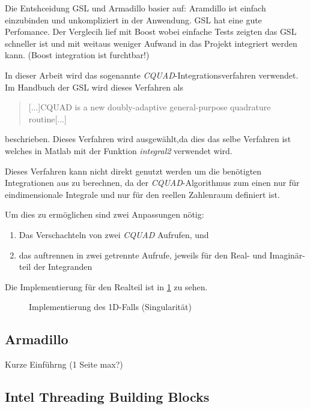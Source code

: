 Die Entshceidung GSL und Armadillo basier auf: Aramdillo ist einfach einzubinden und unkompliziert in der Anwendung.
GSL hat eine gute Perfomance. Der Verglecih lief mit Boost wobei einfache Tests zeigten das GSL schneller ist und mit weitaus weniger Aufwand in das Projekt integriert werden kann.
(Boost integration ist furchtbar!)

In dieser Arbeit wird das sogenannte \textit{CQUAD}-Integrationsverfahren verwendet.
Im Handbuch der GSL wird dieses Verfahren als
\begin{quotation}
    [...]CQUAD is a new doubly-adaptive general-purpose quadrature routine[...]
\end{quotation} \cite*[Kapitel 17.11]{book} beschrieben. Dieses Verfahren wird ausgewählt,da 
dies das selbe Verfahren ist welches in Matlab mit der Funktion \textit{integral2} verwendet wird.

Dieses Verfahren kann nicht direkt genutzt werden um die benötigten Integrationen aus \cite*{gasperini:hal-03209144} zu berechnen, da 
der \textit{CQUAD}-Algorithmus zum einen nur für eindimensionale Integrale und nur für den reellen Zahlenraum definiert ist.

Um dies zu ermöglichen sind zwei Anpassungen nötig:
\begin{enumerate}
    \item Das Verschachteln von zwei \textit{CQUAD} Aufrufen, und
    \item das auftrennen in zwei getrennte Aufrufe, jeweils für den Real- und Imaginär-teil der Integranden
\end{enumerate}

Die Implementierung für den Realteil ist in \ref{integration_2d} zu sehen.

\begin{figure}
    
    \caption{Implementierung des 1D-Falls (Singularität)}
    \label{integration_2d}
\end{figure}



\subsection{Armadillo}

Kurze Einführng (1 Seite max?)

\subsection{Intel Threading Building Blocks}

